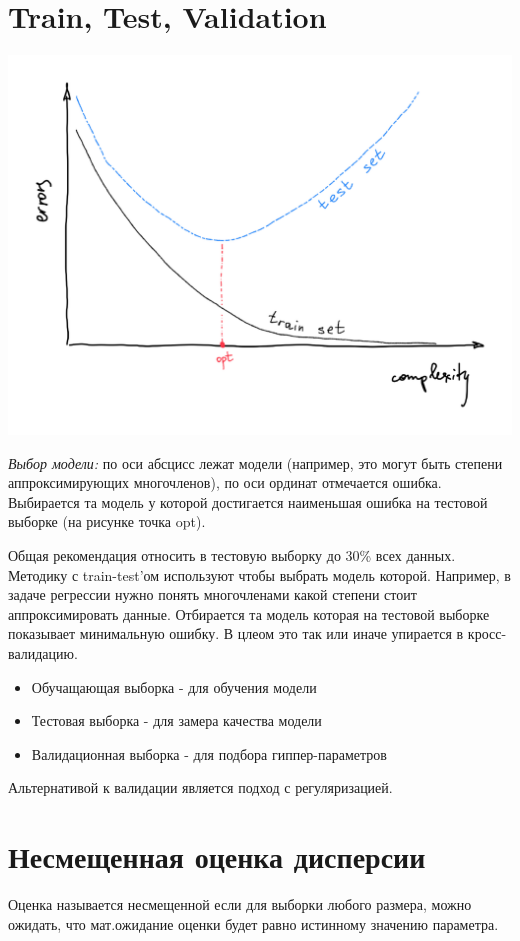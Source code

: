\documentclass[a4paper, oneside]{book}
\begin{document}
\section{Train, Test, Validation}
\begin{marginfigure}
    \includegraphics[width=1\columnwidth]{pics/choise_of_model.pdf}
    \caption{\emph{Выбор модели:} по оси абсцисс лежат модели (например, это могут быть степени аппроксимирующих многочленов), по оси ординат отмечается ошибка. Выбирается та модель у которой достигается наименьшая ошибка на тестовой выборке (на рисунке точка opt).}
    \label{fig:choise_of_model}
\end{marginfigure}
Общая рекомендация относить в тестовую выборку до 30\% всех данных. Методику с train-test'ом используют чтобы выбрать модель которой. Например, в задаче регрессии нужно понять многочленами какой степени стоит аппроксимировать данные. Отбирается та модель которая на тестовой выборке показывает минимальную ошибку. В цлеом это так или иначе упирается в кросс-валидацию.

\begin{itemize}
    \setlength\itemsep{0em}
    \item Обучащающая выборка - для обучения модели
    \item Тестовая выборка - для замера качества модели
    \item Валидационная выборка - для подбора гиппер-параметров
\end{itemize}

Альтернативой к валидации является подход с регуляризацией.

\section{Несмещенная оценка дисперсии}
Оценка называется несмещенной если для выборки любого размера, можно ожидать, что мат.ожидание оценки будет равно истинному значению параметра.
\end{document}
